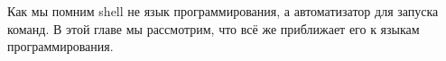 Как мы помним shell не язык программирования, а автоматизатор для запуска команд.
В этой главе мы рассмотрим, что всё же приближает его к языкам программирования.
